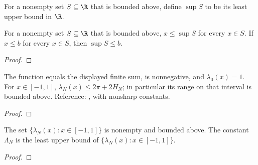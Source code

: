 \begin{supporting}

\begin{definition}
\label{def:classical-real-supremum}
\leanok
For a nonempty set $S\subseteq\R$ that is bounded above, define $\sup S$ to be its least upper bound in $\R$.
\end{definition}

\begin{theorem}
\label{thm:classical-real-supremum}
\leanok
For a nonempty set $S\subseteq\R$ that is bounded above, $x\le\sup S$ for every $x\in S$. If $x\le b$ for every $x\in S$, then $\sup S\le b$.
\end{theorem}
\begin{proof}
\leanok
\end{proof}

\begin{theorem}
\label{thm:extrema-lebesgue-function}
\leanok
The function equals the displayed finite sum, is nonnegative, and
$\lambda_0(x)=1$. For $x\in[-1,1]$,
$\lambda_N(x)\le2\pi+2H_N$; in particular its range on that interval is
bounded above. Reference: \cite[Chapter 15]{atap}, with nonsharp constants.
\end{theorem}
\begin{proof}
\leanok
\end{proof}

\begin{theorem}
\label{thm:extrema-lebesgue-constant}
\leanok
The set $\{\lambda_N(x):x\in[-1,1]\}$ is nonempty and bounded above. The constant $\Lambda_N$ is the least upper bound of
$\{\lambda_N(x):x\in[-1,1]\}$.
\end{theorem}
\begin{proof}
\leanok
\end{proof}


\end{supporting}
